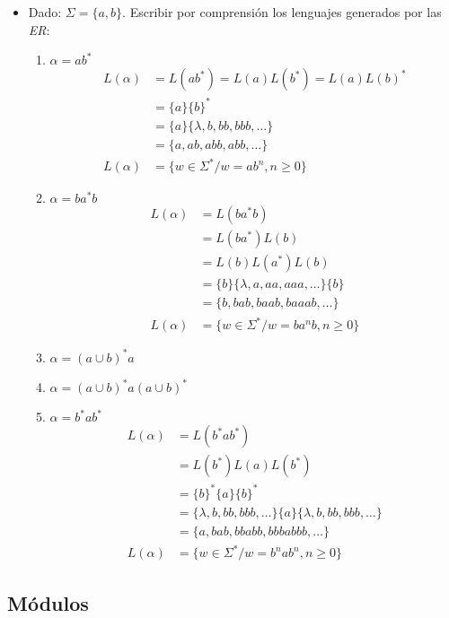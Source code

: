 \begin{itemize}
\item Dado: $\Sigma = \{ a,b \}$. Escribir por comprensión los lenguajes generados por las \textit{ER}:
\begin{enumerate}[label=\alph*)]
\item $\alpha = ab^*$
	\begin{align*}
		L(\alpha ) & = L(ab^* )=L(a)L(b^*) = L(a)L(b)^* \\
			     & = \{ a \} \{ b \}^* \\
			     & = \{ a \} \{ \lambda, b,bb,bbb,\ldots \} \\
			     & = \{ a,ab,abb,abb,\ldots\} \\
		L(\alpha ) & = \{ w\in\Sigma^* / w=ab^n , n\geq 0  \}
	\end{align*}
\item $\alpha = ba^* b$
	\begin{align*}
		L(\alpha ) & = L(ba^*b)\\
			     & = L(ba^* ) L(b) \\
			     & = L(b )L(a^*) L(b) \\
			     & = \{ b \} \{ \lambda ,a,aa,aaa,\ldots\} \{ b\} \\
			     & = \{ b,bab,baab,baaab,\ldots \} \\
		L(\alpha ) & = \{ w\in\Sigma^* / w=ba^n b, n\geq 0 \} 
	\end{align*}
\item $\alpha = (a \cup b )^* a$
\item $\alpha = (a \cup b)^* a (a \cup b)^*$
\item $\alpha = b^* a b^*$
	\begin{align*}
		L(\alpha ) & = L(b^* a b^*)\\
			     & = L(b^*)L(a) L(b^*)\\
			     & = \{b\}^* \{ a \} \{ b\}^* \\
			     & = \{\lambda,b,bb,bbb,\ldots \} \{ a\} \{\lambda,b,bb,bbb,\ldots \} \\
			     & = \{a,bab,bbabb,bbbabbb,\ldots \} \\
		L(\alpha ) & = \{ w\in\Sigma^* / w = b^n a b^n ,n \geq 0 \}
	\end{align*}
\end{enumerate}
\end{itemize}

\subsection{Módulos}
